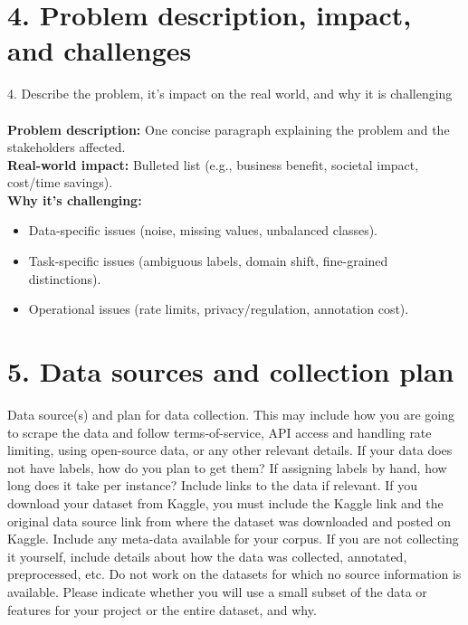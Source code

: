\documentclass[12pt]{article}
\begin{document}
\section*{4. Problem description, impact, and challenges}
4. Describe the problem, it’s impact on the real world, and why it is challenging \\ \\
\textbf{Problem description:} One concise paragraph explaining the problem and the stakeholders affected.\\[4pt]
\textbf{Real-world impact:} Bulleted list (e.g., business benefit, societal impact, cost/time savings).\\[4pt]
\textbf{Why it's challenging:}
\begin{itemize}
  \item Data-specific issues (noise, missing values, unbalanced classes).
  \item Task-specific issues (ambiguous labels, domain shift, fine-grained distinctions).
  \item Operational issues (rate limits, privacy/regulation, annotation cost).
\end{itemize}

\section*{5. Data sources and collection plan}
 Data source(s) and plan for data collection. This may include how you are going to scrape the data
  and follow terms-of-service, API access and handling rate limiting, using open-source data, or 
  any other relevant details. If your data does not have labels, how do you plan to get them? If 
  assigning labels by hand, how long does it take per instance? Include links to the data if relevant.
  If you download your dataset from Kaggle, you must include the Kaggle link and the original data source link
  from where the dataset was downloaded and posted on Kaggle. Include any meta-data available for 
  your corpus. If you are not collecting it yourself, include details about how the data was collected, annotated, preprocessed, etc. Do not work on the
 datasets for which no source information is available. Please indicate whether you will use a small
 subset of the data or features for your project or the entire dataset, and why. 
\end{document}
